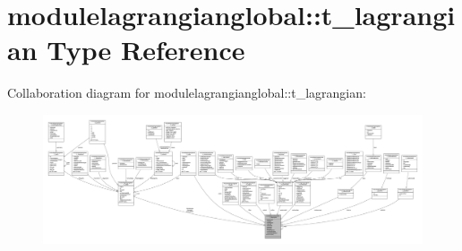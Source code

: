 \hypertarget{structmodulelagrangianglobal_1_1t__lagrangian}{}\section{modulelagrangianglobal\+:\+:t\+\_\+lagrangian Type Reference}
\label{structmodulelagrangianglobal_1_1t__lagrangian}


Collaboration diagram for modulelagrangianglobal\+:\+:t\+\_\+lagrangian\+:\nopagebreak
\begin{figure}[H]
\begin{center}
\leavevmode
\includegraphics[width=350pt]{structmodulelagrangianglobal_1_1t__lagrangian__coll__graph}
\end{center}
\end{figure}
